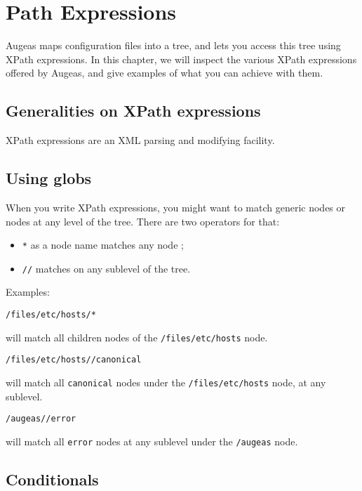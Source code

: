 \chapter{Path Expressions}

 

Augeas maps configuration files into a tree, and lets you access this tree using XPath expressions. In this chapter, we will inspect the various XPath expressions offered by Augeas, and give examples of what you can achieve with them.

\section{Generalities on XPath expressions}

XPath expressions are an XML parsing and modifying facility.

\section{Using globs}

When you write XPath expressions, you might want to match generic nodes or nodes at any level of the tree. There are two operators for that:

\begin{itemize}
\item
  \verb!*! as a node name matches any node ;
\item
  \nolinkurl{//} matches on any sublevel of the tree.
\end{itemize}
Examples:

\begin{verbatim}
/files/etc/hosts/*
\end{verbatim}
will match all children nodes of the \nolinkurl{/files/etc/hosts} node.

\begin{verbatim}
/files/etc/hosts//canonical
\end{verbatim}
will match all \verb!canonical! nodes under the \nolinkurl{/files/etc/hosts} node, at any sublevel.


\begin{verbatim}
/augeas//error
\end{verbatim}
will match all \verb!error! nodes at any sublevel under the \nolinkurl{/augeas} node.

\section{Conditionals}

